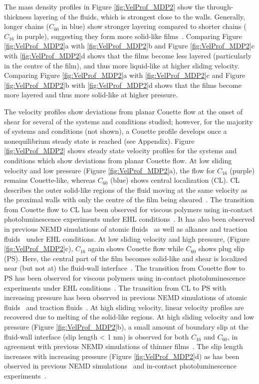 \documentclass[5p]{elsarticle}
\begin{document}
The mass density profiles in Figure \ref{fig:VelProf_MDP2} show the through-thickness layering of the fluids, which is strongest close to the walls. Generally, longer chains ($C_{60}$ in blue) show stronger layering compared to shorter chains ($C_{16}$ in purple), suggesting they form more solid-like films~\cite{Ewen2017a}. Comparing Figure \ref{fig:VelProf_MDP2}a with \ref{fig:VelProf_MDP2}b and Figure \ref{fig:VelProf_MDP2}c with \ref{fig:VelProf_MDP2}d shows that the films become less layered (particularly in the centre of the film), and thus more liquid-like at higher sliding velocity. Comparing Figure \ref{fig:VelProf_MDP2}a with \ref{fig:VelProf_MDP2}c and Figure \ref{fig:VelProf_MDP2}b with \ref{fig:VelProf_MDP2}d shows that the films become more layered and thus more solid-like at higher pressure.

The velocity profiles show deviations from planar Couette flow at the onset of shear for several of the systems and conditions studied; however, for the majority of systems and conditions (not shown), a Couette profile develops once a nonequilibrium steady state is reached (see Appendix). Figure \ref{fig:VelProf_MDP2} shows steady state velocity profiles for the systems and conditions which show deviations from planar Couette flow. At low sliding velocity and low pressure (Figure \ref{fig:VelProf_MDP2}a), the flow for $C_{16}$ (purple) remains Couette-like, whereas $C_{60}$ (blue) shows central localization (CL). CL describes the outer solid-like regions of the fluid moving at the same velocity as the proximal walls with only the centre of the film being sheared~\cite{Heyes2012}. The transition from Couette flow to CL has been observed for viscous polymers using in-contact photoluminescence experiments under EHL conditions~\cite{Galmiche2016}. It has also been observed in previous NEMD simulations of atomic fluids~\cite{Heyes2012,Gattinoni2013,Mackowiak2016} as well as alkanes and traction fluids~\cite{Ewen2017a} under EHL conditions. At low sliding velocity and high pressure, (Figure \ref{fig:VelProf_MDP2}c), $C_{16}$ again shows Couette flow while $C_{60}$ shows plug slip (PS). Here, the central part of the film becomes solid-like and shear is localized near (but not at) the fluid-wall interface~\cite{Heyes2012}. The transition from Couette flow to PS has been observed for viscous polymers using in-contact photoluminescence experiments under EHL conditions~\cite{Ponjavic2014a}. The transition from CL to PS with increasing pressure has been observed in previous NEMD simulations of atomic fluids~\cite{Heyes2012,Gattinoni2013,Mackowiak2016} and traction fluids~\cite{Ewen2017a}. At high sliding velocity, linear velocity profiles are recovered due to melting of the solid-like regions. At high sliding velocity and low pressure (Figure \ref{fig:VelProf_MDP2}b), a small amount of boundary slip at the fluid-wall interface (slip length < 1 nm) is observed for both $C_{16}$ and $C_{60}$, in agreement with previous NEMD simulations of thinner films~\cite{Sivebaek2010,Ta2017}. The slip length increases with increasing pressure (Figure \ref{fig:VelProf_MDP2}d) as has been observed in previous NEMD simulations~\cite{Ta2017} and in-contact photoluminescence experiments~\cite{Ponjavic2014}.
\end{document}
